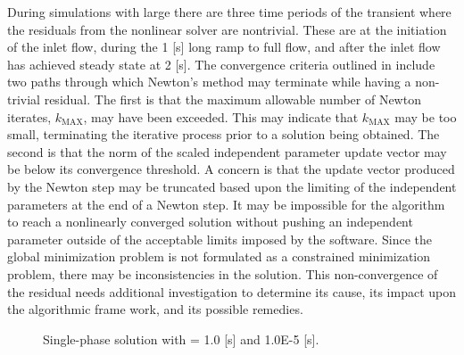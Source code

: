 During simulations with large \dtmax{} there are three time periods of the transient where the residuals from the nonlinear solver are nontrivial.
These are at the initiation of the inlet flow, during the 1 [s] long ramp to full flow, and after the inlet flow has achieved steady state at 2 [s].
The convergence criteria outlined in  include two paths through which Newton's method may terminate while having a non-trivial residual.
The first is that the maximum allowable number of Newton iterates, $k_{\text{MAX}}$, may have been exceeded. 
This may indicate that $k_{\text{MAX}}$ may be too small, terminating the iterative process prior to a solution being obtained.
The second is that the norm of the scaled independent parameter update vector may be below its convergence threshold.
A concern is that the update vector produced by the Newton step may be truncated based upon the limiting of the independent parameters at the end of a Newton step.
It may be impossible for the algorithm to reach a nonlinearly converged solution without pushing an independent parameter outside of the acceptable limits imposed by the software.
Since the global minimization problem is not formulated as a constrained minimization problem, there may be inconsistencies in the solution.
This non-convergence of the residual needs additional investigation to determine its cause, its impact upon the algorithmic frame work, and its possible remedies.

\begin{figure}[h!t]
\centering
{}
\caption[Single-phase solution at \dtmax{} = 1.0 {[s]}and 1.0E-5 {[s]}]{Single-phase solution with \dtmax{} = 1.0 {[s]} and 1.0E-5 {[s]}.}
\label{fig:single_compare_1}
\end{figure}

